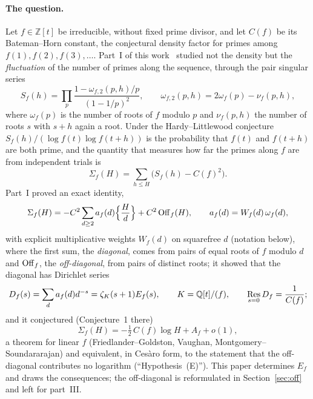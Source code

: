 \documentclass[11pt,a4paper]{article}
\theoremstyle{remark}\newtheorem{remark}[theorem]{Remark}
\newcommand{\Z}{\mathbb{Z}}\newcommand{\Q}{\mathbb{Q}}\newcommand{\F}{\mathbb{F}}\newcommand{\C}{\mathbb{C}}
\begin{document}
\paragraph{The question.} Let $f\in\Z[t]$ be irreducible, without fixed prime divisor, and let $C(f)$ be its
Bateman--Horn constant, the conjectural density factor for primes among $f(1),f(2),f(3),\dots$. Part~I of
this work~\cite{ReichardtFable2026a} studied not the density but the \emph{fluctuation} of the number of
primes along the sequence, through the pair singular series
\[
S_f(h)=\prod_p\frac{1-\omega_{f,2}(p,h)/p}{(1-1/p)^2},\qquad\omega_{f,2}(p,h)=2\omega_f(p)-\nu_f(p,h),
\]
where $\omega_f(p)$ is the number of roots of $f$ modulo $p$ and $\nu_f(p,h)$ the number of roots $s$ with
$s+h$ again a root. Under the Hardy--Littlewood conjecture $S_f(h)/(\log f(t)\log f(t+h))$ is the probability
that $f(t)$ and $f(t+h)$ are both prime, and the quantity that measures how far the primes along $f$ are from
independent trials is
\begin{equation}\label{eq:Sigma}
\Sigma_f(H)=\sum_{h\le H}\bigl(S_f(h)-C(f)^2\bigr).
\end{equation}
Part~I proved an exact identity,
\begin{equation}\label{eq:split}
\Sigma_f(H)=-C^2\sum_{d\ge2}a_f(d)\Bigl\{\frac Hd\Bigr\}+C^2\,\mathrm{Off}_f(H),\qquad a_f(d)=W_f(d)\,\omega_f(d),
\end{equation}
with explicit multiplicative weights $W_f(d)$ on squarefree $d$ (notation below), where the first sum, the
\emph{diagonal}, comes from pairs of equal roots of $f$ modulo $d$ and $\mathrm{Off}_f$, the \emph{off-diagonal}, from
pairs of distinct roots; it showed that the diagonal has Dirichlet series
\[
D_f(s)=\sum_da_f(d)d^{-s}=\zeta_K(s+1)E_f(s),\qquad K=\Q[t]/(f),\qquad\Res_{s=0}D_f=\frac1{C(f)};
\]
and it conjectured (Conjecture~1 there)
\begin{equation}\label{eq:conj}
\Sigma_f(H)=-\tfrac12\,C(f)\log H+A_f+o(1),
\end{equation}
a theorem for linear $f$ (Friedlander--Goldston, Vaughan, Montgomery--Soundararajan) and equivalent, in
Ces\`aro form, to the statement that the off-diagonal contributes no logarithm (``Hypothesis~(E)''). This
paper determines $E_f$ and draws the consequences; the off-diagonal is reformulated in
Section~\ref{sec:off} and left for part~III.
\end{document}
